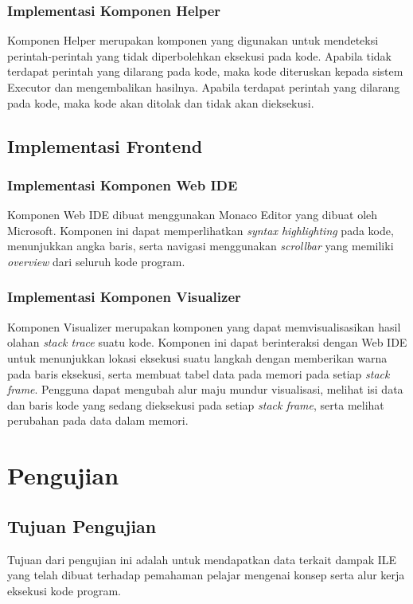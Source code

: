 \subsubsection{Implementasi Komponen Helper}
Komponen Helper merupakan komponen yang digunakan untuk mendeteksi perintah-perintah yang tidak diperbolehkan eksekusi pada kode. Apabila tidak terdapat perintah yang dilarang pada kode, maka kode diteruskan kepada sistem Executor dan mengembalikan hasilnya. Apabila terdapat perintah yang dilarang pada kode, maka kode akan ditolak dan tidak akan dieksekusi.


\subsection{Implementasi Frontend}

\subsubsection{Implementasi Komponen Web IDE}
Komponen Web IDE dibuat menggunakan Monaco Editor yang dibuat oleh Microsoft. Komponen ini dapat memperlihatkan \textit{syntax highlighting} pada kode, menunjukkan angka baris, serta navigasi menggunakan \textit{scrollbar} yang memiliki \textit{overview} dari seluruh kode program.

\subsubsection{Implementasi Komponen Visualizer}
Komponen Visualizer merupakan komponen yang dapat memvisualisasikan hasil olahan \textit{stack trace} suatu kode. Komponen ini dapat berinteraksi dengan Web IDE untuk menunjukkan lokasi eksekusi suatu langkah dengan memberikan warna pada baris eksekusi, serta membuat tabel data pada memori pada setiap \textit{stack frame}. Pengguna dapat mengubah alur maju mundur visualisasi, melihat isi data dan baris kode yang sedang dieksekusi pada setiap \textit{stack frame}, serta melihat perubahan pada data dalam memori.


\section{Pengujian}

\subsection{Tujuan Pengujian}
Tujuan dari pengujian ini adalah untuk mendapatkan data terkait dampak ILE yang telah dibuat terhadap pemahaman pelajar mengenai konsep serta alur kerja eksekusi kode program.

